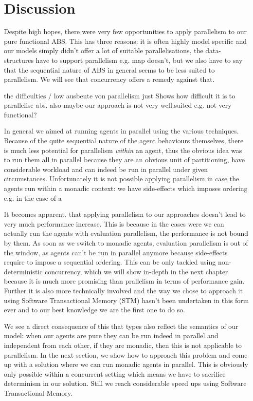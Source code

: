 \section{Discussion}
Despite high hopes, there were very few opportunities to apply parallelism to our pure functional ABS. This has three reasons: it is often highly model specific and our models simply didn't offer a lot of suitable parallelisations, the data-structures have to support parallelism e.g. map doesn't, but we also have to say that the sequential nature of ABS in general seems to be less suited to parallelism. We will see that concurrency offers a remedy against that.

the difficulties / low ausbeute von parallelism just Shows how difficult it is to parallelise abs. also maybe our approach is not very well.suited e.g. not very functional?

In general we aimed at running agents in parallel using the various techniques. Because of the quite sequential nature of the agent behaviours themselves, there is much less potential for parallelism \textit{within} an agent, thus the obvious idea was to run them all in parallel because they are an obvious unit of partitioning, have considerable workload and can indeed be run in parallel under given circumstances.
Unfortunately it is not possible applying parallelism in case the agents run within a monadic context: we have side-effects which imposes ordering e.g. in the case of a

It becomes apparent, that applying parallelism to our approaches doesn't lead to very much performance increase. This is because in the cases were we can actually run the agents with evaluation parallelism, the performance is not bound by them. As soon as we switch to monadic agents, evaluation parallelism is out of the window, as agents can't be run in parallel anymore because side-effects require to impose a sequential ordering. This can be only tackled using non-deterministic concurrency, which we will show in-depth in the next chapter because it is much more promising than prallelism in terms of performance gain. Further it is also more technically involved and the way we chose to approach it using Software Transactional Memory (STM) hasn't been undertaken in this form ever and to our best knowledge we are the first one to do so.

We see a direct consequence of this that types also reflect the semantics of our model: when our agents are pure they can be run indeed in parallel and independent from each other, if they are monadic, then this is not applicable to parallelism. In the next section, we show how to approach this problem and come up with a solution where we can run monadic agents in parallel. This is obviously only possible within a concurrent setting which means we have to sacrifice determinism in our solution. Still we reach considerable speed ups using Software Transactional Memory.

